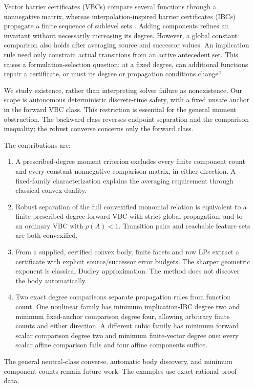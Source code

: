 \documentclass[journal,10pt]{IEEEtran}
\theoremstyle{definition}\newtheorem{definition}{Definition}
\theoremstyle{remark}
\begin{document}
Vector barrier certificates (VBCs) compare several functions through a nonnegative matrix, whereas interpolation-inspired barrier certificates (IBCs) propagate a finite sequence of sublevel sets \cite{vector,ibc,submission}. Adding components refines an invariant without necessarily increasing its degree. However, a global constant comparison also holds after averaging source and successor values. An implication rule need only constrain actual transitions from an active antecedent set. This raises a formulation-selection question: at a fixed degree, can additional functions repair a certificate, or must its degree or propagation conditions change?

We study existence, rather than interpreting solver failure as nonexistence. Our scope is autonomous deterministic discrete-time safety, with a fixed unsafe anchor in the forward VBC class. This restriction is essential for the general moment obstruction. The backward class reverses endpoint separation and the comparison inequality; the robust converse concerns only the forward class.

The contributions are:
\begin{enumerate}
\item A prescribed-degree moment criterion excludes every finite component count and every constant nonnegative comparison matrix, in either direction. A fixed-family characterization explains the averaging requirement through classical convex duality.
\item Robust separation of the full convexified monomial relation is equivalent to a finite prescribed-degree forward VBC with strict global propagation, and to an ordinary VBC with $\rho(A)<1$. Transition pairs and reachable feature sets are both convexified.
\item From a supplied, certified convex body, finite facets and row LPs extract a certificate with explicit source/successor error budgets. The sharper geometric exponent is classical Dudley approximation. The method does not discover the body automatically.
\item Two exact degree comparisons separate propagation rules from function count. One nonlinear family has minimum implication-IBC degree two and minimum fixed-anchor comparison degree four, allowing arbitrary finite counts and either direction. A different cubic family has minimum forward scalar comparison degree two and minimum finite-vector degree one: every scalar affine comparison fails and four affine components suffice.
\end{enumerate}
The general neutral-class converse, automatic body discovery, and minimum component counts remain future work. The examples use exact rational proof data.
\end{document}
